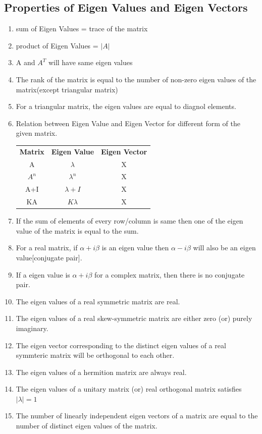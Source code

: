 \subsection*{Properties of Eigen Values and Eigen Vectors}
\begin{enumerate}
    \item sum of Eigen Values = trace of the matrix
    \item product of Eigen Values = \(|A|\)
    \item A and \(A^T\) will have same eigen values
    \item The rank of the matrix is equal to the number of non-zero eigen values of the matrix(except triangular matrix)
    \item For a triangular matrix, the eigen values are equal to diagnol elements.
    \item Relation between Eigen Value and Eigen Vector for different form of the given matrix.
    \begin{table}[h!]
    \centering
    \setlength{\tabcolsep}{1em}
    \begin{tabu}{ccc}
    \textbf{Matrix} & \textbf{Eigen Value}               & \textbf{Eigen Vector} \\
    A               & \(\lambda\)                        & X                     \\
    \(A^n\)         & \(\lambda^n\)                      & X                     \\
    A+I             & \(\lambda+I\)                      & X                     \\
    KA              & \(K\lambda\)                       & X                    
    \end{tabu}
    \end{table}
    \item If the sum of elements of every row/column is same then one of the eigen value of the matrix is equal to the sum.
    \item For a real matrix, if \(\alpha+i\beta\) is an eigen value then \(\alpha-i\beta\) will also be an eigen value[conjugate pair].
    \item If a eigen value is \(\alpha+i\beta\) for a complex matrix, then there is no conjugate pair.
    \item The eigen values of a real symmetric matrix are real.
    \item The eigen values of a real skew-symmetric matrix are either zero (or) purely imaginary.
    \item The eigen vector corresponding to the distinct eigen values of a real symmteric matrix will be orthogonal to each other.
    \item The eigen values of a hermition matrix are always real.
    \item The eigen values of a unitary matrix (or) real orthogonal matrix satisfies \(|\lambda|=1\)
    \item The number of linearly independent eigen vectors of a matrix are equal to the number of distinct eigen values of the matrix.
\end{enumerate}


